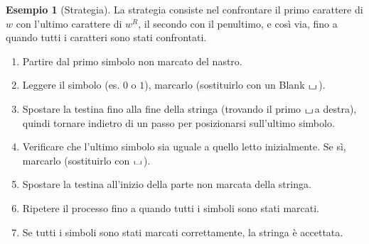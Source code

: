 \documentclass[a4paper]{article}
\theoremstyle{definition} %
\newtheorem{example}{Esempio}
\newcommand{\blankS}{\ensuremath{\raisebox{-0.15ex}{\scalebox{1.3}[0.7]{$\sqcup$}}\mkern2mu}}
\begin{document}
\begin{example}[Strategia]
La strategia consiste nel confrontare il primo carattere di $w$ con l'ultimo carattere di $w^R$, il secondo con il penultimo, e così via, fino a quando tutti i caratteri sono stati confrontati.
\begin{enumerate}
    \item Partire dal primo simbolo non marcato del nastro.
    \item Leggere il simbolo (es. $0$ o $1$), marcarlo (sostituirlo con un Blank $\blankS$).
    \item Spostare la testina fino alla fine della stringa (trovando il primo \blankS a destra), quindi tornare indietro di un passo per posizionarsi sull'ultimo simbolo.
    \item Verificare che l'ultimo simbolo sia uguale a quello letto inizialmente. Se sì, marcarlo (sostituirlo con \blankS).
    \item Spostare la testina all'inizio della parte non marcata della stringa.
    \item Ripetere il processo fino a quando tutti i simboli sono stati marcati.
    \item Se tutti i simboli sono stati marcati correttamente, la stringa è accettata.
\end{enumerate}
\end{example}

\end{document}
